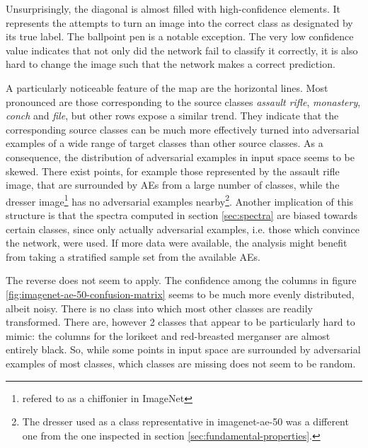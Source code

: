 \documentclass[11pt, a4paper]{article}
\begin{document}
Unsurprisingly, the diagonal is almost filled with high-confidence elements. It represents the attempts to turn an image into the correct class as designated by its true label. The ballpoint pen is a notable exception. The very low confidence value indicates that not only did the network fail to classify it correctly, it is also hard to change the image such that the network makes a correct prediction.

A particularly noticeable feature of the map are the horizontal lines. Most pronounced are those corresponding to the source classes \emph{assault rifle}, \emph{monastery}, \emph{conch} and \emph{file}, but other rows expose a similar trend. They indicate that the corresponding source classes can be much more effectively turned into adversarial examples of a wide range of target classes than other source classes. As a consequence, the distribution of adversarial examples in input space seems to be skewed. There exist points, for example those represented by the assault rifle image, that are surrounded by AEs from a large number of classes, while the dresser image\footnote{refered to as a chiffonier in ImageNet} has no adversarial examples nearby\footnote{The dresser used as a class representative in imagenet-ae-50 was a different one from the one inspected in section \ref{sec:fundamental-properties}.}. Another implication of this structure is that the spectra computed in section \ref{sec:spectra} are biased towards certain classes, since only actually adversarial examples, i.e. those which convince the network, were used. If more data were available, the analysis might benefit from taking a stratified sample set from the available AEs.

The reverse does not seem to apply. The confidence among the columns in figure \ref{fig:imagenet-ae-50-confusion-matrix} seems to be much more evenly distributed, albeit noisy. There is no class into which most other classes are readily transformed. There are, however 2 classes that appear to be particularly hard to mimic: the columns for the lorikeet and red-breasted merganser are almost entirely black. So, while some points in input space are surrounded by adversarial examples of most classes, which classes are missing does not seem to be random. 
\end{document}
